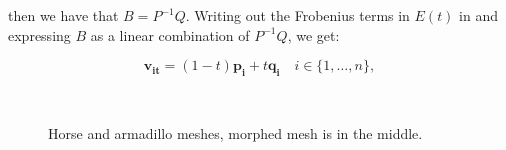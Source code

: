 \documentclass[12pt]{article}
\begin{document}
then we have that $B = P^{-1}Q$.
Writing out the Frobenius terms in $E(t)$ in and expressing $B$ as a linear combination of $P^{-1}Q$, we get:

\begin{equation*}
\mathbf{v_{it}} = (1 - t) \mathbf{p_i} + t \mathbf{q_i} \quad i \in \lbrace 1, \ldots, n \rbrace,
\end{equation*}

\begin{figure}
\\
\caption{Horse and armadillo meshes, morphed mesh is in the middle.}
\label{fig:linearInterpolation}
\end{figure}
\end{document}
